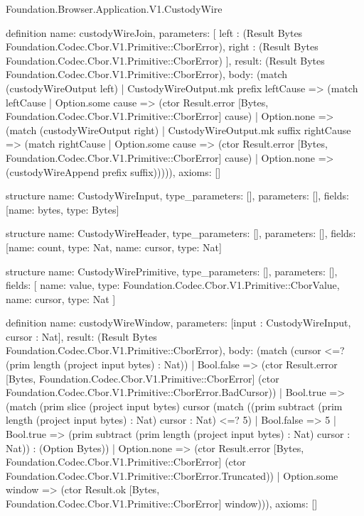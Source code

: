 \begin{lexlean}{Foundation.Browser.Application.V1.CustodyWire}
\begin{semanticmodule}
definition{
  name: custodyWireJoin,
  parameters: [
    left : (Result Bytes Foundation.Codec.Cbor.V1.Primitive::CborError),
    right : (Result Bytes Foundation.Codec.Cbor.V1.Primitive::CborError)
  ],
  result: (Result Bytes Foundation.Codec.Cbor.V1.Primitive::CborError),
  body: (match (custodyWireOutput left)
    | CustodyWireOutput.mk prefix leftCause => (match leftCause
      | Option.some cause => (ctor Result.error [Bytes, Foundation.Codec.Cbor.V1.Primitive::CborError] cause)
      | Option.none => (match (custodyWireOutput right)
        | CustodyWireOutput.mk suffix rightCause => (match rightCause
          | Option.some cause => (ctor Result.error [Bytes, Foundation.Codec.Cbor.V1.Primitive::CborError] cause)
          | Option.none => (custodyWireAppend prefix suffix))))),
  axioms: []
}

structure{
  name: CustodyWireInput,
  type_parameters: [],
  parameters: [],
  fields: [{name: bytes, type: Bytes}]
}

structure{
  name: CustodyWireHeader,
  type_parameters: [],
  parameters: [],
  fields: [{name: count, type: Nat}, {name: cursor, type: Nat}]
}

structure{
  name: CustodyWirePrimitive,
  type_parameters: [],
  parameters: [],
  fields: [
    {name: value, type: Foundation.Codec.Cbor.V1.Primitive::CborValue},
    {name: cursor, type: Nat}
  ]
}

definition{
  name: custodyWireWindow,
  parameters: [input : CustodyWireInput, cursor : Nat],
  result: (Result Bytes Foundation.Codec.Cbor.V1.Primitive::CborError),
  body: (match (cursor <=? (prim length (project input bytes) : Nat))
    | Bool.false => (ctor Result.error [Bytes, Foundation.Codec.Cbor.V1.Primitive::CborError] (ctor Foundation.Codec.Cbor.V1.Primitive::CborError.BadCursor))
    | Bool.true => (match (prim slice (project input bytes) cursor (match ((prim subtract (prim length (project input bytes) : Nat) cursor : Nat) <=? 5)
        | Bool.false => 5
        | Bool.true => (prim subtract (prim length (project input bytes) : Nat) cursor : Nat)) : (Option Bytes))
      | Option.none => (ctor Result.error [Bytes, Foundation.Codec.Cbor.V1.Primitive::CborError] (ctor Foundation.Codec.Cbor.V1.Primitive::CborError.Truncated))
      | Option.some window => (ctor Result.ok [Bytes, Foundation.Codec.Cbor.V1.Primitive::CborError] window))),
  axioms: []
}


\end{semanticmodule}
\end{lexlean}
